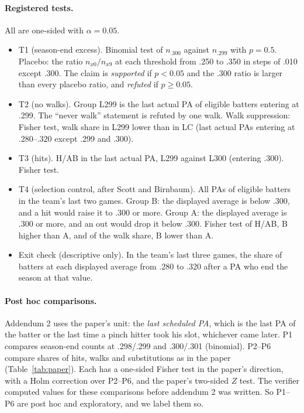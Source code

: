 \documentclass[11pt]{article}
\begin{document}
\paragraph{Registered tests.} All are one-sided with $\alpha = 0.05$.
\begin{itemize}
\item T1 (season-end excess). Binomial test of $n_{.300}$ against $n_{.299}$ with $p = 0.5$. Placebo: the ratio $n_{x0}/n_{x9}$ at each threshold from .250 to .350 in steps of .010 except .300. The claim is \emph{supported} if $p < 0.05$ and the .300 ratio is larger than every placebo ratio, and \emph{refuted} if $p \ge 0.05$.
\item T2 (no walks). Group L299 is the last actual PA of eligible batters entering at .299. The ``never walk'' statement is refuted by one walk. Walk suppression: Fisher test, walk share in L299 lower than in LC (last actual PAs entering at .280--.320 except .299 and .300).
\item T3 (hits). H/AB in the last actual PA, L299 against L300 (entering .300). Fisher test.
\item T4 (selection control, after Scott and Birnbaum). All PAs of eligible batters in the team's last two games. Group B: the displayed average is below .300, and a hit would raise it to .300 or more. Group A: the displayed average is .300 or more, and an out would drop it below .300. Fisher test of H/AB, B higher than A, and of the walk share, B lower than A.
\item Exit check (descriptive only). In the team's last three games, the share of batters at each displayed average from .280 to .320 after a PA who end the season at that value.
\end{itemize}

\paragraph{Post hoc comparisons.} Addendum 2 uses the paper's unit: the \emph{last scheduled PA}, which is the last PA of the batter or the last time a pinch hitter took his slot, whichever came later. P1 compares season-end counts at .298/.299 and .300/.301 (binomial). P2--P6 compare shares of hits, walks and substitutions as in the paper (Table~\ref{tab:paper}). Each has a one-sided Fisher test in the paper's direction, with a Holm correction over P2--P6, and the paper's two-sided $Z$ test. The verifier computed values for these comparisons before addendum 2 was written. So P1--P6 are post hoc and exploratory, and we label them so.
\end{document}
